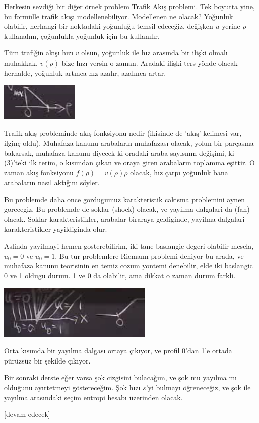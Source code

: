 \documentclass[12pt,fleqn]{article}\usepackage{../../common}
\begin{document}
Herkesin sevdiği bir diğer örnek problem Trafik Akış problemi. Tek boyutta yine,
bu formülle trafik akışı modellenebiliyor. Modellenen ne olacak? Yoğunluk
olabilir, herhangi bir noktadaki yoğunluğu temsil edeceğiz, değişken $u$ yerine
$\rho$ kullanalım, çoğunlukla yoğunluk için bu kullanılır.

Tüm trafiğin akışı hızı $v$ olsun, yoğunluk ile hız arasında bir ilişki olmalı
muhakkak, $v(\rho)$ bize hızı versin o zaman. Aradaki ilişki ters yönde olacak
herhalde, yoğunluk artınca hız azalır, azalınca artar. 

\includegraphics[width=10em]{compscieng_2_08_04.png}

Trafik akış probleminde akış fonksiyonu nedir (ikisinde de 'akış' kelimesi var,
ilginç oldu). Muhafaza kanunu arabaların muhafazası olacak, yolun bir parçasına
bakarsak, muhafaza kanunu diyecek ki oradaki araba sayısının değişimi, ki
(3)'teki ilk terim, o kısımdan çıkan ve oraya giren arabaların toplamına
eşittir. O zaman akış fonksiyonu $f(\rho) = v(\rho) \rho$ olacak, hız çarpı
yoğunluk bana arabaların nasıl aktığını söyler.

Bu problemde daha once gordugumuz karakteristik cakisma problemini aynen
gorecegiz. Bu problemde de soklar (shock) olacak, ve yayilma dalgalari da (fan)
olacak. Soklar karakteristikler, arabalar biraraya geldiginde, yayilma dalgalari
karakteristikler yayildiginda olur.

Aslinda yayilmayi hemen gosterebilirim, iki tane baslangic degeri olabilir
mesela, $u_0 = 0$ ve $u_0 = 1$. Bu tur problemlere Riemann problemi deniyor
bu arada, ve muhafaza kanunu teorisinin en temiz cozum yontemi denebilir,
elde iki baslangic 0 ve 1 oldugu durum. 1 ve 0 da olabilir, ama dikkat
o zaman durum farkli.

\includegraphics[width=20em]{compscieng_2_08_05.png}

Orta kısımda bir yayılma dalgası ortaya çıkıyor, ve profil 0'dan 1'e ortada
pürüzsüz bir şekilde çıkıyor. 

Bir sonraki derste eğer varsa şok cizgisini bulacağım, ve şok mu yayılma mı
olduğunu ayırtetmeyi göstereceğim. Şok hızı $s$'yi bulmayı öğreneceğiz, ve şok
ile yayılma arasındaki seçim entropi hesabı üzerinden olacak.













[devam edecek]
  
\end{document}
